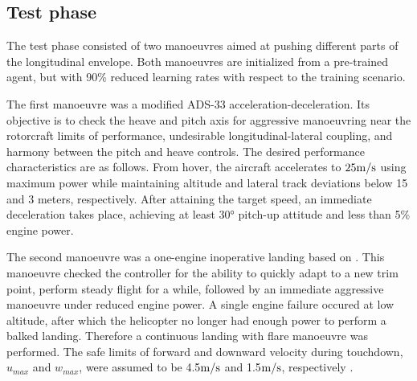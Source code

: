 \subsection{Test phase} \label{ssec:testphase}

The test phase consisted of two manoeuvres aimed at pushing different parts of the longitudinal envelope. Both manoeuvres are initialized from a pre-trained agent, but with 90\% reduced learning rates with respect to the training scenario. 

The first manoeuvre was a modified ADS-33 \cite{ADS33} acceleration-deceleration. Its objective is to check the heave and pitch axis for aggressive manoeuvring near the rotorcraft limits of performance, undesirable longitudinal-lateral coupling, and harmony between the pitch and heave controls. The desired performance characteristics are as follows. From hover, the aircraft accelerates to $25\si[per-mode=symbol]{\meter \per \second}$ using maximum power while maintaining altitude and lateral track deviations below 15 and 3 meters, respectively. After attaining the target speed, an immediate deceleration takes place, achieving at least $30\si{\degree}$ pitch-up attitude and less than 5\% engine power. 

The second manoeuvre was a one-engine inoperative landing based on \cite{Gille2006}. This manoeuvre checked the controller for the ability to quickly adapt to a new trim point, perform steady flight for a while, followed by an immediate aggressive manoeuvre under reduced engine power. A single engine failure occured at low altitude, after which the helicopter no longer had enough power to perform a balked landing. Therefore a continuous landing with flare manoeuvre was performed. The safe limits of forward and downward velocity during touchdown, $u_{max}$ and $w_{max}$, were assumed to be 4.5$\si[per-mode=symbol]{\meter \per \second}$ and 1.5$\si[per-mode=symbol]{\meter \per \second}$, respectively \cite{OEILandings}.